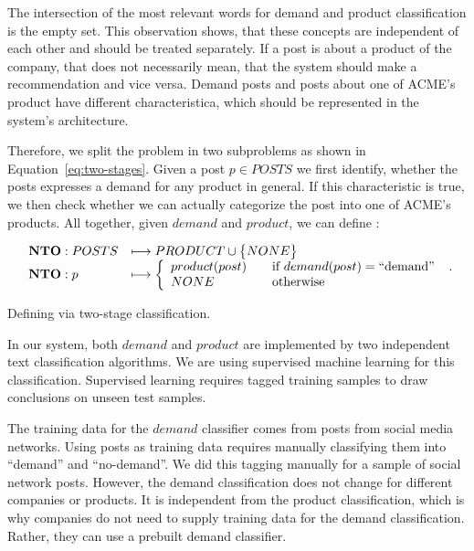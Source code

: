 The intersection of the most relevant words for demand and product classification is the empty set.
This observation shows, that these concepts are independent of each other and should be treated separately.
If a post is about a product of the company, that does not necessarily mean, that the system should make a recommendation and vice versa.
Demand posts and posts about one of ACME's product have different characteristica, which should be represented in the system's architecture.

Therefore, we split the \nto problem in two subproblems as shown in Equation~\ref{eq:two-stages}. Given a post $p \in POSTS$ we first identify, whether the posts expresses a demand for any product in general.
If this characteristic is true, we then check whether we can actually categorize the post into one of ACME's products.
All together, given $demand$ and $product$, we can define \nto:


\begin{equationBlock}
	\[
		\begin{array}{l l}
			\mathbf{NTO}: POSTS & \longmapsto PRODUCT \cup \big\{ NONE \big\} \\
			\mathbf{NTO}: p  & \longmapsto \left\{
				\begin{array}{l l}
				  product(post) & \quad \text{if}~demand(post) = \operatorname{``demand''}\\
				  NONE & \quad \text{otherwise}
				\end{array} \right.
		\end{array} .
	\]
	\caption{Defining \nto via two-stage classification.}
	\label{eq:two-stages}
\end{equationBlock}

In our system, both $demand$ and $product$ are implemented by two independent text classification algorithms.
We are using supervised machine learning for this classification.
Supervised learning requires tagged training samples to draw conclusions on unseen test samples.

The training data for the $demand$ classifier comes from posts from social media networks.
Using posts as training data requires manually classifying them into ``demand'' and ``no-demand''.
We did this tagging manually for a sample of social network posts.
However, the demand classification does not change for different companies or products.
It is independent from the product classification, which is why companies do not need to supply training data for the demand classification.
Rather, they can use a prebuilt demand classifier.

